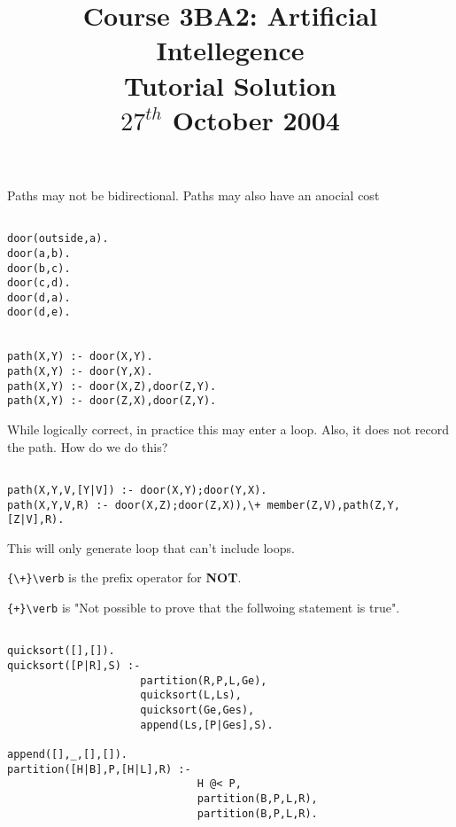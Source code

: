 \documentclass[a4paper,12pt]{article}
\begin{document}
\title{Course 3BA2: Artificial Intellegence \\ Tutorial Solution\\ $27^{th}$ October 2004}

\maketitle



Paths may not be bidirectional. Paths may also have an anocial cost

\begin{verbatim}

door(outside,a).
door(a,b).
door(b,c).
door(c,d).
door(d,a).
door(d,e).


path(X,Y) :- door(X,Y).
path(X,Y) :- door(Y,X).
path(X,Y) :- door(X,Z),door(Z,Y).
path(X,Y) :- door(Z,X),door(Z,Y).

\end{verbatim}

While logically correct, in practice this may enter a loop. Also, it
does not record the path. How do we do this?

\begin{verbatim}

path(X,Y,V,[Y|V]) :- door(X,Y);door(Y,X).
path(X,Y,V,R) :- door(X,Z);door(Z,X)),\+ member(Z,V),path(Z,Y,[Z|V],R).

\end{verbatim}

This will only generate loop that can't include loops.

\verb!{\+}\verb! is the prefix  operator for \textbf{NOT}.

\verb!{+}\verb! is "Not possible to prove that the follwoing statement
is true".

\begin{verbatim}

quicksort([],[]).
quicksort([P|R],S) :- 
                     partition(R,P,L,Ge),
                     quicksort(L,Ls),
                     quicksort(Ge,Ges),
                     append(Ls,[P|Ges],S).

append([],_,[],[]).
partition([H|B],P,[H|L],R) :-
                              H @< P,
                              partition(B,P,L,R),
                              partition(B,P,L,R).

\end{verbatim}
\end{document}
